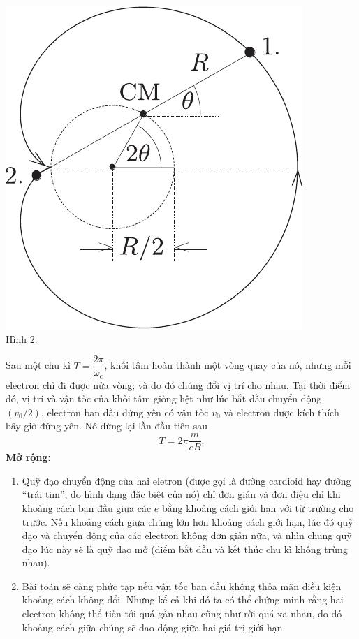 \begin{loigiai}
\begin{enumerate}[1)]
    \begin{center}
        \includegraphics[scale=0.75]{Anh/Nam4.pdf}\\
        Hình $2$.
    \end{center}
     Sau một chu kì $T = \dfrac{2\pi}{\omega_{\mathrm{c}}}$, khối tâm hoàn thành một vòng quay của nó, nhưng mỗi electron chỉ đi được nửa vòng; và do đó chúng đổi vị trí cho nhau. Tại thời điểm đó, vị trí và vận tốc của khối tâm giống hệt như lúc bắt đầu chuyển động $(v_0/2)$, electron ban đầu đứng yên có vận tốc $v_0$ và electron được kích thích bây giờ đứng yên. Nó dừng lại lần đầu tiên sau 
     \[T = 2\pi \dfrac{m}{eB}.\]
    \textbf{Mở rộng:}
    \begin{enumerate}[1)]
        \item Quỹ đạo chuyển động của hai eletron (được gọi là đường cardioid hay đường “trái tim”, do hình dạng đặc biệt của nó) chỉ đơn giản và đơn điệu chỉ khi khoảng cách ban đầu giữa các $e$ bằng khoảng cách giới hạn với từ trường cho trước. Nếu khoảng cách giữa chúng lớn hơn khoảng cách giới hạn, lúc đó quỹ đạo và chuyển động của các electron không đơn giản nữa, và nhìn chung quỹ đạo lúc này sẽ là quỹ đạo mở (điểm bắt đầu và kết thúc chu kì không trùng nhau).
        \item Bài toán sẽ càng phức tạp nếu vận tốc ban đầu không thỏa mãn điều kiện khoảng cách không đổi. Nhưng kể cả khi đó ta có thể chứng minh rằng hai electron không thể tiến tới quá gần nhau cũng như rời quá xa nhau, do đó khoảng cách giữa chúng sẽ dao động giữa hai giá trị giới hạn.
    \end{enumerate}
        
    \end{enumerate}
\end{loigiai}


